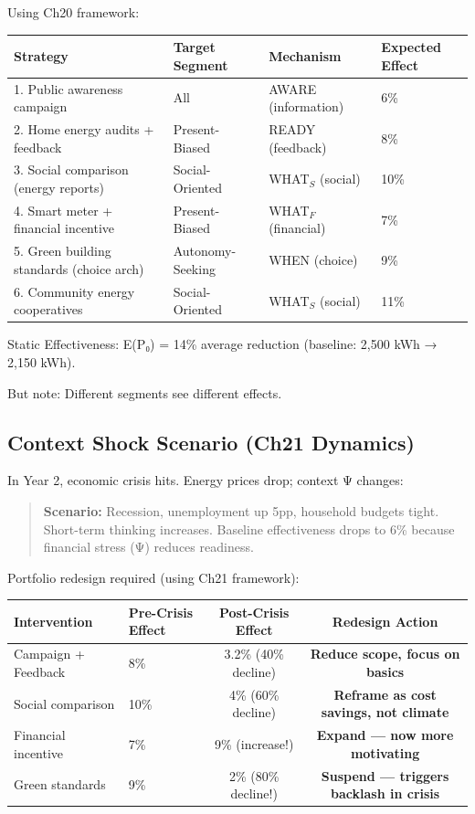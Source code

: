 Using Ch20 framework:

\begin{center}
\begin{tabular}{@{}llll@{}}
\toprule
\textbf{Strategy} & \textbf{Target Segment} & \textbf{Mechanism} & \textbf{Expected Effect} \\
\midrule
1. Public awareness campaign & All & AWARE (information) & 6\% \\
2. Home energy audits + feedback & Present-Biased & READY (feedback) & 8\% \\
3. Social comparison (energy reports) & Social-Oriented & WHAT$_S$ (social) & 10\% \\
4. Smart meter + financial incentive & Present-Biased & WHAT$_F$ (financial) & 7\% \\
5. Green building standards (choice arch) & Autonomy-Seeking & WHEN (choice) & 9\% \\
6. Community energy cooperatives & Social-Oriented & WHAT$_S$ (social) & 11\% \\
\midrule
\end{tabular}
\end{center}

Static Effectiveness: E(P₀) = 14\% average reduction (baseline: 2,500 kWh → 2,150 kWh).

But note: Different segments see different effects.

\subsection{Context Shock Scenario (Ch21 Dynamics)}

In Year 2, economic crisis hits. Energy prices drop; context Ψ changes:

\begin{quote}
\textbf{Scenario:} Recession, unemployment up 5pp, household budgets tight. Short-term thinking increases. Baseline effectiveness drops to 6\% because financial stress (Ψ) reduces readiness.
\end{quote}

Portfolio redesign required (using Ch21 framework):

\begin{center}
\begin{tabular}{@{}llcc@{}}
\toprule
\textbf{Intervention} & \textbf{Pre-Crisis Effect} & \textbf{Post-Crisis Effect} & \textbf{Redesign Action} \\
\midrule
Campaign + Feedback & 8\% & 3.2\% (40\% decline) & \textbf{Reduce scope, focus on basics} \\
Social comparison & 10\% & 4\% (60\% decline) & \textbf{Reframe as cost savings, not climate} \\
Financial incentive & 7\% & 9\% (increase!) & \textbf{Expand --- now more motivating} \\
Green standards & 9\% & 2\% (80\% decline!) & \textbf{Suspend --- triggers backlash in crisis} \\
\midrule
\end{tabular}
\end{center}

